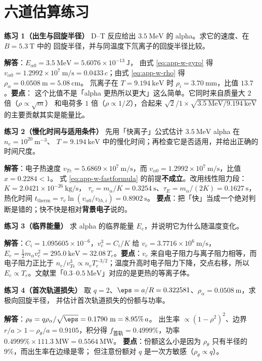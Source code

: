 \section{六道估算练习}
\label{sec:app-w-problems}

\textbf{练习 1（出生与回旋半径）}
D--T 反应给出 $3.5\ \mathrm{MeV}$ 的 alpha。求它的速度、在 $B=5.3\ \mathrm{T}$ 中的
回旋半径，并与同温度下氘离子的回旋半径比较。

\textbf{解答}：$E_{\alpha 0}=3.5\ \mathrm{MeV}=5.6076\times10^{-13}\ \mathrm{J}$，
由式 \eqref{eq:app-w-gyro} 得 $v_{\alpha 0}=1.2992\times10^{7}\ \mathrm{m/s}
=0.0433\,c$；由式 \eqref{eq:app-w-rho} 得 $\rho_\alpha=0.0508\ \mathrm{m}=5.08\ \mathrm{cm}$。
氘离子在 $T=9.194\ \mathrm{keV}$ 时 $\rho_i=3.70\ \mathrm{mm}$，比值 $13.7$。\textbf{要点}：
这个比值不是「alpha 更热所以更大」这么简单。它同时来自质量大 $2$ 倍（$\rho\propto\sqrt{m}$）
和电荷多 $1$ 倍（$\rho\propto1/Z$），合起来 $\sqrt{2}/1\times\sqrt{3.5\ \mathrm{MeV}/9.194\ \mathrm{keV}}$
的主要贡献其实是能量比。

\textbf{练习 2（慢化时间与适用条件）}
先用「快离子」公式估计 $3.5\ \mathrm{MeV}$ alpha 在 $n_e=10^{20}\ \mathrm{m^{-3}}$、
$T=9.194\ \mathrm{keV}$ 中的慢化时间；再检查它是否适用，并给出正确的时间尺度。

\textbf{解答}：电子热速度 $v_{Te}=5.6869\times10^{7}\ \mathrm{m/s}$，而
$v_{\alpha 0}=1.2992\times10^{7}\ \mathrm{m/s}$，比值 $x=0.2284<1$。
式 \eqref{eq:app-w-fastformula} 的前提\textbf{不成立}。改用线性阻力段：$K=2.0421\times10^{-26}\ \mathrm{kg/s}$，
$\tau_v=m_\alpha/K=0.3254\ \mathrm{s}$、$\tau_E=m_\alpha/(2K)=0.1627\ \mathrm{s}$，
热化时间 $t_{\text{therm}}=\tau_v\ln(v_{\alpha 0}/v_{th,i})=0.8902\ \mathrm{s}$。
\textbf{要点}：把「快」当成一个绝对判断是错的；快不快是相对\textbf{背景电子}说的。

\textbf{练习 3（临界能量）}
求 alpha 的临界能量 $E_c$，并说明它为什么随温度变化。

\textbf{解答}：$C_i=1.095605\times10^{-6}$，$v_c^3=C_i/K$ 给
$v_c=3.7716\times10^{6}\ \mathrm{m/s}$，$E_c=\frac12m_\alpha v_c^2=295.0\ \mathrm{keV}
=32.08\,T_e$。\textbf{要点}：$v_c$ 来自电子阻力与离子阻力相等，而电子阻力正比于
$n_e/v_{Te}^3\propto n_e T_e^{-3/2}$；温度升高时电子阻力下降，交点右移，所以
$E_c\propto T_e$。文献里「$0.3$--$0.5\ \mathrm{MeV}$」对应的是更热的等离子体。

\textbf{练习 4（首次轨道损失）}
取 $q=2$、$\eps=a/R=0.322581$、$\rho_\alpha=0.0508\ \mathrm{m}$，求极向回旋半径，
并估计首次轨道损失的份额与功率。

\textbf{解答}：$\rho_\theta=q\rho_\alpha/\sqrt{\eps}=0.1790\ \mathrm{m}=8.95\%\,a$。
出生率 $\propto(1-\rho^2)^2$、边界 $r/a>1-\rho_\theta/a=0.9105$，积分得
$f_{\text{首轨}}=0.4999\%$，功率 $0.4999\%\times111.3\ \mathrm{MW}=0.5564\ \mathrm{MW}$。
\textbf{要点}：份额这么小是因为 $\rho_\theta$ 只有半径的 $9\%$，而出生率在边缘是零；
但注意份额对 $q$ 是一次方敏感（$\rho_\theta\propto q$）。

